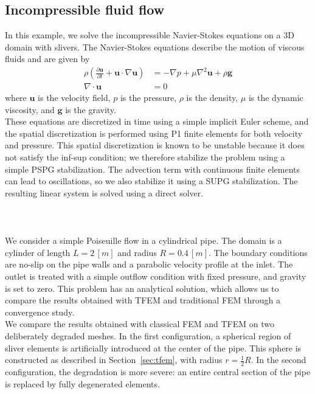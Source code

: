 \documentclass{article}
\begin{document}
\subsection{Incompressible fluid flow}
In this example, we solve the incompressible Navier-Stokes equations on a 3D domain with slivers. The Navier-Stokes equations describe the motion of viscous fluids and are given by
\begin{align}
\rho \left( \frac{\partial \mathbf{u}}{\partial t} + \mathbf{u} \cdot \nabla \mathbf{u} \right) &= -\nabla p + \mu \nabla^2 \mathbf{u} + \rho \mathbf{g} \\
\nabla \cdot \mathbf{u} &= 0
\end{align}
where $\mathbf{u}$ is the velocity field, $p$ is the pressure, $\rho$ is the density, $\mu$ is the dynamic viscosity, and $\mathbf{g}$ is the gravity. \\
These equations are discretized in time using a simple implicit Euler scheme, and the spatial discretization is performed using P1 finite elements for both velocity and pressure. This spatial discretization is known to be unstable because it does not satisfy the inf-sup condition; we therefore stabilize the problem using a simple PSPG stabilization. The advection term with continuous finite elements can lead to oscillations, so we also stabilize it using a SUPG stabilization. The resulting linear system is solved using a direct solver.  \\ \\
\\
\\
We consider a simple Poiseuille flow in a cylindrical pipe. The domain is a cylinder of length $L = 2 \, [m]$ and radius $R=0.4 \, [m]$. The boundary conditions are no-slip on the pipe walls and a parabolic velocity profile at the inlet. The outlet is treated with a simple outflow condition with fixed pressure, and gravity is set to zero. This problem has an analytical solution, which allows us to compare the results obtained with TFEM and traditional FEM through a convergence study.\\
We compare the results obtained with classical FEM and TFEM on two deliberately degraded meshes. In the first configuration, a spherical region of sliver elements is artificially introduced at the center of the pipe. This sphere is constructed as described in Section~\ref{sec:tfem}, with radius $r=\frac{1}{2}R$. In the second configuration, the degradation is more severe: an entire central section of the pipe is replaced by fully degenerated elements.
\end{document}
